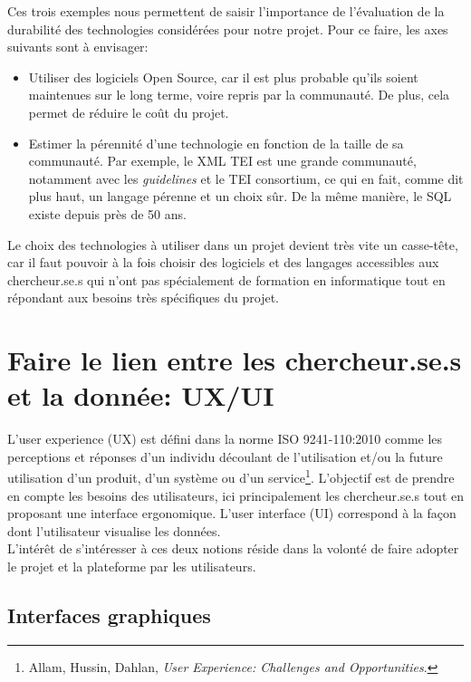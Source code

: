 Ces trois exemples nous permettent de saisir l’importance de l’évaluation de la durabilité des technologies considérées pour notre projet. Pour ce faire, les axes suivants sont à envisager:\\

\begin{itemize}
    \item Utiliser des logiciels Open Source, car il est plus probable qu’ils soient maintenues sur le long terme, voire repris par la communauté. De plus, cela permet de réduire le coût du projet.
    \item Estimer la pérennité d’une technologie en fonction de la taille de sa communauté. Par exemple, le XML TEI est une grande communauté, notamment avec les \textit{guidelines} et le TEI consortium, ce qui en fait, comme dit plus haut, un langage pérenne et un choix sûr. De la même manière, le SQL existe depuis près de 50 ans.\\
    
\end{itemize}


Le choix des technologies à utiliser dans un projet devient très vite un casse-tête, car il faut pouvoir à la fois choisir des logiciels et des langages accessibles aux chercheur.se.s qui n’ont pas spécialement de formation en informatique tout en répondant aux besoins très spécifiques du projet.


    \section{Faire le lien entre les chercheur.se.s et la donnée: UX/UI}

L’user experience (UX) est défini dans la norme ISO 9241-110:2010 comme les perceptions et réponses d’un individu découlant de l’utilisation et/ou la future utilisation d’un produit, d’un système ou d’un service\footnote{Allam, Hussin, Dahlan, \textit{User Experience: Challenges and Opportunities}.}. L’objectif est de prendre en compte les besoins des utilisateurs, ici principalement les chercheur.se.s tout en proposant une interface ergonomique. L’user interface (UI) correspond à la façon dont l’utilisateur visualise les données. \\
L’intérêt de s’intéresser à ces deux notions réside dans la volonté de faire adopter le projet et la plateforme par les utilisateurs. 
    
    \subsection{Interfaces graphiques}

